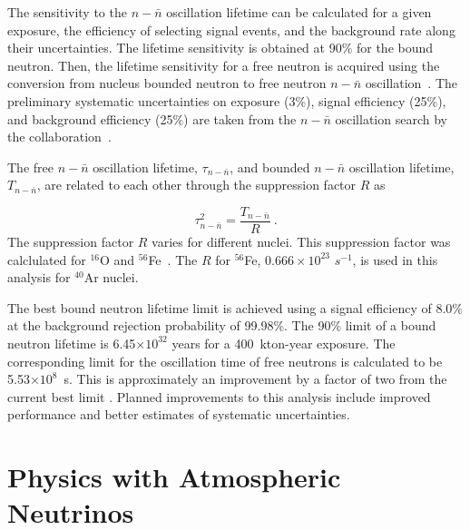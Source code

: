 The sensitivity to the $n-\bar{n}$ oscillation lifetime can be calculated for a given exposure, the efficiency of selecting signal events, and the background rate along their uncertainties. The lifetime sensitivity is obtained at 90\%  for the bound neutron. Then, the lifetime sensitivity for a free neutron is acquired using the conversion from nucleus bounded neutron to free neutron $n-\bar{n}$ oscillation~\cite{Friedman:2008es}.  The preliminary systematic uncertainties on exposure (3\%), signal efficiency (25\%), and background efficiency (25\%) are taken from the $n-\bar{n}$ oscillation search by the \superk collaboration~\cite{Abe:2011ky}.

The free $n-\bar{n}$ oscillation lifetime, $\tau_{n-\bar{n}}$, and bounded $n-\bar{n}$ oscillation lifetime, $T_{n-\bar{n}}$, are related to each other through the suppression factor $R$ as

\begin{equation}
    \tau^{2}_{n-\bar{n}} = \frac{T_{n-\bar{n}}}{R} ~.
    \label{eq:tau}
\end{equation}
The suppression factor $R$ varies for different nuclei. This suppression factor was calclulated for $^{16}$O and $^{56}$Fe~\cite{Friedman:2008es}. The $R$ for $^{56}$Fe, $0.666\times10^{23}$ $s^{-1}$, is used in this analysis for $^{40}$Ar nuclei.

The best bound neutron lifetime limit is achieved using a signal efficiency of 8.0$\%$ at the background rejection probability of 99.98$\%$. The 90$\%$  limit of a bound neutron lifetime is 6.45$\times 10^{32}$ years for a 400~kton-year exposure. The corresponding  limit for the oscillation time of free neutrons is calculated to be 5.53$\times 10^{8}$~s. This is approximately an improvement by a factor of two from the current best limit \cite{Abe:2011ky}.  Planned improvements to this analysis include improved  performance and better estimates of systematic uncertainties.

\section{Physics with Atmospheric Neutrinos}
\label{sec:nonaccel-atm}

